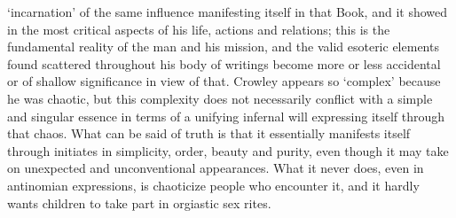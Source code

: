 \begin{footnotesize}
\begin{sffamily}
`incarnation' of the same influence manifesting itself in that Book, and it showed in the most critical aspects of his life, actions and relations; this is the fundamental reality of the man and his mission, and the valid esoteric elements found scattered throughout his body of writings become more or less accidental or of shallow significance in view of that. Crowley appears so `complex' because he was chaotic, but this complexity does not necessarily conflict with a simple and singular essence in terms of a unifying infernal will expressing itself through that chaos. What can be said of truth is that it essentially manifests itself through initiates in simplicity, order, beauty and purity, even though it may take on unexpected and unconventional appearances. What it never does, even in antinomian expressions, is chaoticize people who encounter it, and it hardly wants children to take part in orgiastic sex rites.


\end{sffamily}
\end{footnotesize}
